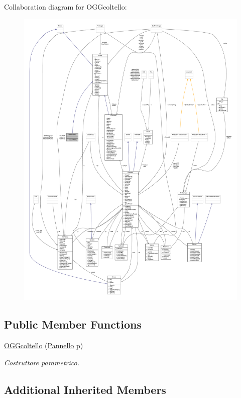 Collaboration diagram for O\+G\+Gcoltello\+:
\nopagebreak
\begin{figure}[H]
\begin{center}
\leavevmode
\includegraphics[width=350pt]{classoggetti_1_1_o_g_gcoltello__coll__graph}
\end{center}
\end{figure}
\subsection*{Public Member Functions}
\begin{DoxyCompactItemize}
\item 
\hyperlink{classoggetti_1_1_o_g_gcoltello_a813ca00c0be23b40227a4b6262c108ef}{O\+G\+Gcoltello} (\hyperlink{classa_1_1survival_1_1game_1_1_pannello}{Pannello} p)
\begin{DoxyCompactList}\small\item\em Costruttore parametrico. \end{DoxyCompactList}\end{DoxyCompactItemize}
\subsection*{Additional Inherited Members}


